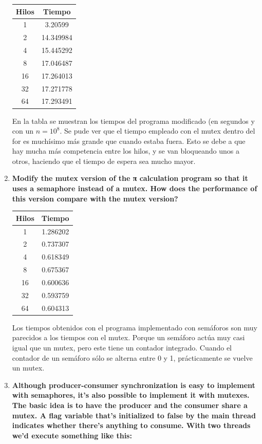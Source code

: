 \documentclass[a4paper,12pt]{article}
\begin{document}
\begin{enumerate}
\begin{center}
\begin{tabular}{|c|c|}\hline
\textbf{Hilos} & \textbf{Tiempo}\\\hline
1 & 3.20599\\\hline
2 & 14.349984\\\hline
4 & 15.445292\\\hline
8 & 17.046487\\\hline
16 & 17.264013\\\hline
32 & 17.271778\\\hline
64 & 17.293491\\\hline
\end{tabular}
\end{center}

En la tabla se muestran los tiempos del programa modificado (en segundos y con un $n = 10^{8}$. Se pude ver que el tiempo
empleado con el mutex dentro del for es muchísimo más grande que cuando estaba fuera. Esto se debe a que hay mucha más
competencia entre los hilos, y se van bloqueando unos a otros, haciendo que el tiempo de espera sea mucho mayor.

\item \textbf{Modify the mutex version of the π calculation program so that it uses a semaphore instead of a mutex.
How does the performance of this version compare with the mutex version?}

\begin{center}
\begin{tabular}{|c|c|}\hline
\textbf{Hilos} & \textbf{Tiempo}\\\hline
1 & 1.286202\\\hline
2 & 0.737307\\\hline
4 & 0.618349\\\hline
8 & 0.675367\\\hline
16 & 0.600636\\\hline
32 & 0.593759\\\hline
64 & 0.604313\\\hline
\end{tabular}
\end{center}

Los tiempos obtenidos con el programa implementado con semáforos son muy parecidos a los tiempos con el mutex. Porque un
semáforo actúa muy casi igual que un mutex, pero este tiene un contador integrado. Cuando el contador de un semáforo sólo
se alterna entre 0 y 1, prácticamente se vuelve un mutex.

\item{ \textbf{Although producer-consumer synchronization is easy to implement with semaphores, it’s also possible to
implement it with mutexes. The basic idea is to have the producer and the consumer share a mutex. A flag variable that’s
initialized to false by the main thread indicates whether there’s anything to consume. With two threads we’d execute
something like this:}

}
\end{enumerate}
\end{document}
